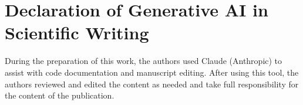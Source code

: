 \section*{Declaration of Generative AI in Scientific Writing}
During the preparation of this work, the authors used Claude (Anthropic) to assist with code documentation and manuscript editing. After using this tool, the authors reviewed and edited the content as needed and take full responsibility for the content of the publication.
\label{declaration of generative ai in scientific writing}